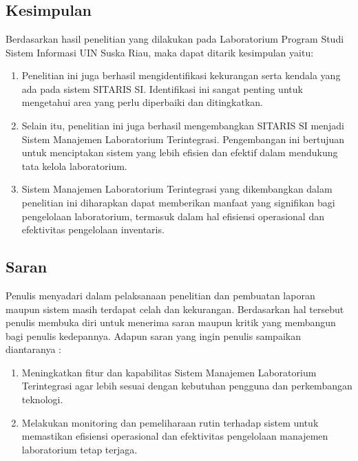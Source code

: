 %
%
%
%


\chapter{\babEnam}
\section{Kesimpulan}
Berdasarkan hasil penelitian yang dilakukan pada Laboratorium Program Studi Sistem Informasi UIN Suska Riau, maka dapat ditarik kesimpulan yaitu:

\begin{enumerate}
	\item Penelitian ini juga berhasil mengidentifikasi kekurangan serta kendala yang ada pada sistem SITARIS SI. Identifikasi ini sangat penting untuk mengetahui area yang perlu diperbaiki dan ditingkatkan.
	\item Selain itu, penelitian ini juga berhasil mengembangkan SITARIS SI menjadi Sistem Manajemen Laboratorium Terintegrasi. Pengembangan ini bertujuan untuk menciptakan sistem yang lebih efisien dan efektif dalam mendukung tata kelola laboratorium.
	\item Sistem Manajemen Laboratorium Terintegrasi yang dikembangkan dalam penelitian ini diharapkan dapat memberikan manfaat yang signifikan bagi pengelolaan laboratorium, termasuk dalam hal efisiensi operasional dan efektivitas pengelolaan inventaris.
\end{enumerate}

\section{Saran}
Penulis menyadari dalam pelaksanaan penelitian dan pembuatan laporan maupun sistem masih terdapat celah dan kekurangan. Berdasarkan hal tersebut penulis membuka diri untuk menerima saran maupun kritik yang membangun bagi penulis kedepannya. Adapun saran yang ingin penulis sampaikan diantaranya :

\begin{enumerate}
	\item Meningkatkan fitur dan kapabilitas Sistem Manajemen Laboratorium Terintegrasi agar lebih sesuai dengan kebutuhan pengguna dan perkembangan teknologi.
	\item Melakukan monitoring dan pemeliharaan rutin terhadap sistem untuk memastikan efisiensi operasional dan efektivitas pengelolaan manajemen laboratorium tetap terjaga.
\end{enumerate}
